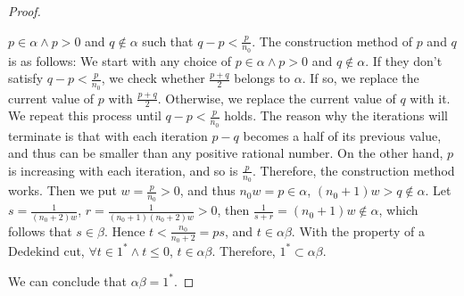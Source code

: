 \documentclass{article}
\begin{document}
\begin{proof}
\begin{itemize}
    $p \in \alpha \wedge p > 0$ and $q \notin \alpha$ such that 
    $q - p < \frac{p}{n_0}$. The construction method of $p$ and $q$ is as 
    follows: We start with any choice of $p \in \alpha \wedge p > 0$ and 
    $q \notin \alpha$. If they don't satisfy $q - p < \frac{p}{n_0}$, we check 
    whether $\frac{p+q}{2}$ belongs to $\alpha$. If so, we replace the current 
    value of $p$ with $\frac{p+q}{2}$. Otherwise, we replace the current value 
    of $q$ with it. We repeat this process until $q - p < \frac{p}{n_0}$ holds.
    The reason why the iterations will terminate is that with each iteration 
    $p - q$ becomes a half of its previous value, and thus can be smaller than 
    any positive rational number. On the other hand, $p$ is increasing with each 
    iteration, and so is $\frac{p}{n_0}$. Therefore, the construction method 
    works. Then we put $w = \frac{p}{n_0} > 0$, and thus $n_0 w = p \in \alpha$, 
    $(n_0 + 1)w > q \notin \alpha$. Let $s = \frac{1}{(n_0+2)w}$, 
    $r = \frac{1}{(n_0+1)(n_0+2)w} > 0$, then 
    $\frac{1}{s+r} = (n_0+1)w \notin \alpha$, which follows that $s \in \beta$. 
    Hence $t < \frac{n_0}{n_0+2} = ps$, and $t \in \alpha \beta$. With the 
    property of a Dedekind cut, $\forall t \in 1^* \wedge t \leq 0$, 
    $t \in \alpha \beta$. Therefore, $1^* \subset \alpha \beta$.
  \end{itemize}
  We can conclude that $\alpha \beta = 1^*$.
\end{proof}
\end{document}
